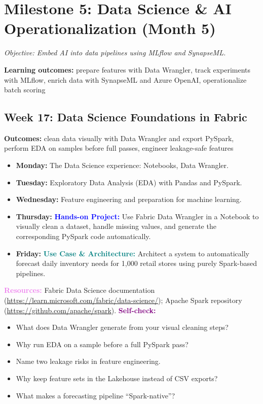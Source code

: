 \documentclass[11pt, a4paper]{article}
\newcommand{\project}[1]{\vspace{1mm}\noindent\textbf{\textcolor{blue}{Hands-on Project:}} #1}
\newcommand{\usecase}[1]{\vspace{1mm}\noindent\textbf{\textcolor{teal}{Use Case \& Architecture:}} #1}
\newcommand{\dayitem}[2]{\item \textbf{#1:} #2}
\newcommand{\resources}[1]{\vspace{1mm}\noindent\textbf{\textcolor{violet}{Resources:}} #1}
\newcommand{\selfcheck}[1]{\vspace{1mm}\noindent\textbf{\textcolor{purple}{Self-check:}} #1}
\begin{document}
\section{Milestone 5: Data Science \& AI Operationalization (Month 5)}
\textit{Objective: Embed AI into data pipelines using MLflow and SynapseML.}
\par\noindent\textbf{Learning outcomes:} prepare features with Data Wrangler, track experiments with MLflow, enrich data with SynapseML and Azure OpenAI, operationalize batch scoring

\subsection*{Week 17: Data Science Foundations in Fabric}
\par\noindent\textbf{Outcomes:} clean data visually with Data Wrangler and export PySpark, perform EDA on samples before full passes, engineer leakage-safe features
\begin{itemize}[label=-]
    \dayitem{Monday}{The Data Science experience: Notebooks, Data Wrangler.}
    \dayitem{Tuesday}{Exploratory Data Analysis (EDA) with Pandas and PySpark.}
    \dayitem{Wednesday}{Feature engineering and preparation for machine learning.}
    \dayitem{Thursday}{\project{Use Fabric Data Wrangler in a Notebook to visually clean a dataset, handle missing values, and generate the corresponding PySpark code automatically.}}
    \dayitem{Friday}{\usecase{Architect a system to automatically forecast daily inventory needs for 1,000 retail stores using purely Spark-based pipelines.}}
\end{itemize}
\resources{Fabric Data Science documentation (\url{https://learn.microsoft.com/fabric/data-science/}); Apache Spark repository (\url{https://github.com/apache/spark}).}
\selfcheck{
\begin{itemize}[label=$\bullet$, leftmargin=6mm, itemsep=0pt]
    \item What does Data Wrangler generate from your visual cleaning steps?
    \item Why run EDA on a sample before a full PySpark pass?
    \item Name two leakage risks in feature engineering.
    \item Why keep feature sets in the Lakehouse instead of CSV exports?
    \item What makes a forecasting pipeline ``Spark-native''?
\end{itemize}
}
\end{document}
